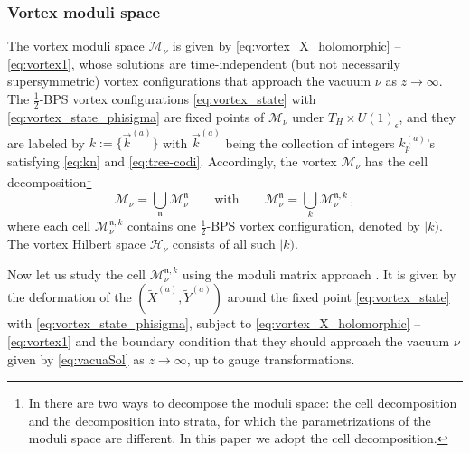 \documentclass[12pt,a4paper]{article}
\newcommand{\nn}{\mathfrak{n}}
\renewcommand{\(}{\left(}
\renewcommand{\)}{\right)}
\renewcommand{\(}{\left(}
\renewcommand{\)}{\right)}
\begin{document}
\subsubsection{Vortex moduli space}

The vortex moduli space $\mathcal{M}_{\nu}$ is given by \eqref{eq:vortex_X_holomorphic} -- \eqref{eq:vortex1}, whose solutions are  time-independent (but not necessarily supersymmetric) vortex configurations that approach the vacuum $\nu$ as $z\rightarrow\infty$.
The $\frac{1}{2}$-BPS vortex configurations \eqref{eq:vortex_state} with \eqref{eq:vortex_state_phisigma}
are fixed points of $\mathcal{M}_{\nu}$ under $T_{H}\times U(1)_{\epsilon}$, and they are labeled by $k:=\{\vec{k}^{(a)}\}$ with $\vec{k}^{(a)}$ being the collection of integers $k^{(a)}_p$'s satisfying \eqref{eq:kn} and \eqref{eq:tree-codi}.
Accordingly, the vortex $\mathcal{M}_\nu$ has the cell decomposition\footnote{In \cite{Bullimore:2016hdc} there are two ways to decompose the moduli space: the cell decomposition and the decomposition into strata, for which the parametrizations of the moduli space are different.
In this paper we adopt the cell decomposition.}
\begin{equation}
\mathcal{M}_\nu=\bigcup_{\nn} \mathcal{M}^{\nn}_\nu
\qquad \textrm{with} \qquad
\mathcal{M}^\nn_\nu=\bigcup_k \mathcal{M}^{\nn,k}_\nu\,,
\end{equation}
where each cell $\mathcal{M}^{\nn,k}_\nu$ contains one $\frac{1}{2}$-BPS vortex configuration, denoted by $|k)$.
The vortex Hilbert space $\mathcal{H}_{\nu}$ consists of all such $|k)$.

\medskip

Now let us study the cell $\mathcal{M}^{\nn,k}_\nu$ using the moduli matrix approach \cite{Eto:2005yh,Eto:2006pg}.
It is given by the deformation of the $(\tilde{X}^{(a)}, \tilde{Y}^{(a)})$ around the fixed point \eqref{eq:vortex_state} with \eqref{eq:vortex_state_phisigma}, subject to \eqref{eq:vortex_X_holomorphic} -- \eqref{eq:vortex1} and the boundary condition that they should approach the vacuum $\nu$ given by \eqref{eq:vacuaSol}
as $z\rightarrow \infty$, up to gauge transformations.
\end{document}

